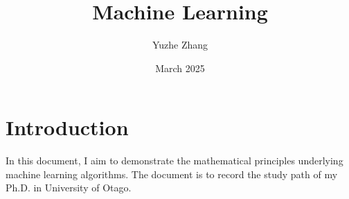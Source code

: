 \documentclass{book}
\title{Machine Learning}
\author{Yuzhe Zhang}
\date{March 2025}
\begin{document}
\maketitle

\section{Introduction}
In this document, I aim to demonstrate the mathematical principles underlying machine learning algorithms. The document is to record the study path of my Ph.D. in University of Otago. 

\end{document}
